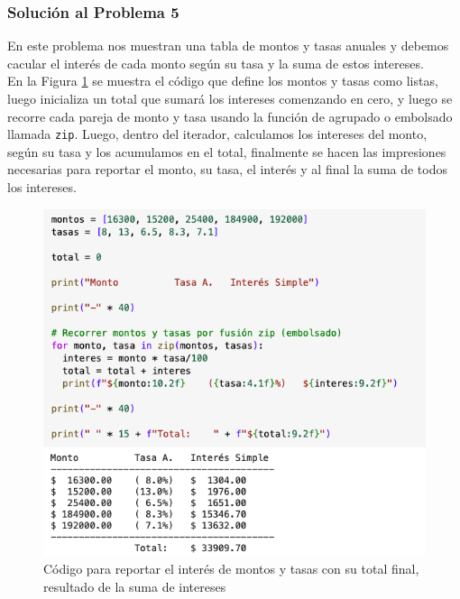 \documentclass{article}
\begin{document}
\clearpage

\subsubsection*{Solución al Problema 5}

En este problema nos muestran una tabla de montos y tasas anuales y debemos cacular el interés de cada monto según su tasa y la suma de estos intereses.
\\[12pt]
En la Figura \ref{fig:s105-1} se muestra el código que define los montos y tasas como listas, luego inicializa un total que sumará los intereses comenzando en cero, y luego se recorre cada pareja de monto y tasa usando la función de agrupado o embolsado llamada \texttt{zip}. Luego, dentro del iterador, calculamos los intereses del monto, según su tasa y los acumulamos en el total, finalmente se hacen las impresiones necesarias para reportar el monto, su tasa, el interés y al final la suma de todos los intereses.
\begin{figure}[!ht]
    \centering
    \begin{minipage}{\textwidth}
        \centering
        \includegraphics[width=\textwidth]{figures/s105-1.png}
    \end{minipage}
    \captionsetup{width=0.9\textwidth}
    \caption{Código para reportar el interés de montos y tasas con su total final, resultado de la suma de intereses}
    \label{fig:s105-1}
\end{figure}
\end{document}
